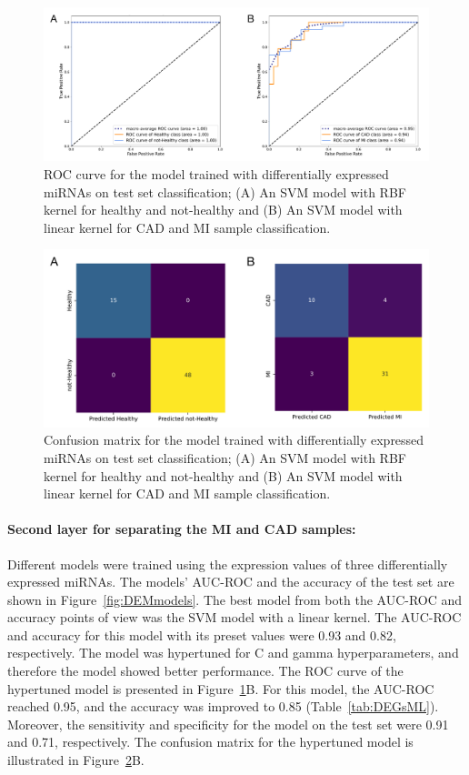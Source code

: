 \documentclass[sn-mathphys,Numbered]{sn-jnl}%
\theoremstyle{thmstyleone}%
\theoremstyle{thmstyletwo}%
\theoremstyle{thmstylethree}%
\begin{document}
\begin{figure}
\centering 
\includegraphics[width=0.95\linewidth]{DEMs ROCs h not h cad mi}
\caption{ROC curve for the model trained with differentially expressed miRNAs on test set classification; (A) An SVM model with RBF kernel for healthy and not-healthy and (B) An SVM model with linear kernel for CAD and MI sample classification.}\label{fig:DEMROC}
\end{figure}

\begin{figure}
\centering 
\includegraphics[width=0.9\linewidth]{DEMs Conf. matrix}
\caption{Confusion matrix for the model trained with differentially expressed miRNAs on test set classification; (A) An SVM model with RBF kernel for healthy and not-healthy and (B) An SVM model with linear kernel for CAD and MI sample classification.}\label{fig:DEMCF}
\end{figure}

\paragraph{Second layer for separating the MI and CAD
samples:}\label{second-layer-for-separating-the-mi-and-cad-samples-2}

Different models were trained using the expression values of three
differentially expressed miRNAs. The models' AUC-ROC and the accuracy of
the test set are shown in Figure~\ref{fig:DEMmodels}. The best model
from both the AUC-ROC and accuracy points of view was the SVM model with
a linear kernel. The AUC-ROC and accuracy for this model with its preset
values were 0.93 and 0.82, respectively. The model was hypertuned for C
and gamma hyperparameters, and therefore the model showed better
performance. The ROC curve of the hypertuned model is presented in
Figure~\ref{fig:DEMROC}B. For this model, the AUC-ROC reached 0.95, and
the accuracy was improved to 0.85 (Table~\ref{tab:DEGsML}). Moreover,
the sensitivity and specificity for the model on the test set were 0.91
and 0.71, respectively. The confusion matrix for the hypertuned model is
illustrated in Figure~\ref{fig:DEMCF}B.
\end{document}
